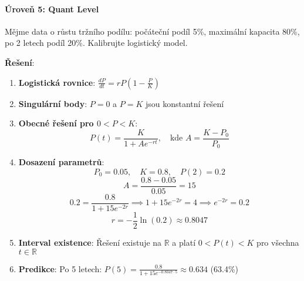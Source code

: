 \vspace{0.8\baselineskip}

\paragraph*{Úroveň 5: Quant Level}

\begin{example}
    Mějme data o růstu tržního podílu: počáteční podíl 5\%, maximální kapacita 80\%, po 2 letech podíl 20\%. Kalibrujte logistický model.
    
    \vspace{0.3\baselineskip}
    
    \textbf{Řešení}: 
    \begin{enumerate}
    \item \textbf{Logistická rovnice}: $\frac{dP}{dt} = rP(1 - \frac{P}{K})$
    
    \item \textbf{Singulární body}: $P = 0$ a $P = K$ jsou konstantní řešení
    
    \item \textbf{Obecné řešení pro $0 < P < K$}:
    \[
    P(t) = \frac{K}{1 + Ae^{-rt}}, \quad \text{kde } A = \frac{K - P_0}{P_0}
    \]
    
    \item \textbf{Dosazení parametrů}:
    \[
    P_0 = 0.05, \quad K = 0.8, \quad P(2) = 0.2
    \]
    \[
    A = \frac{0.8 - 0.05}{0.05} = 15
    \]
    \[
    0.2 = \frac{0.8}{1 + 15e^{-2r}} \implies 1 + 15e^{-2r} = 4 \implies e^{-2r} = 0.2
    \]
    \[
    r = -\frac{1}{2}\ln(0.2) \approx 0.8047
    \]
    
    \item \textbf{Interval existence}: Řešení existuje na $\mathbb{R}$ a platí $0 < P(t) < K$ pro všechna $t \in \mathbb{R}$
    
    \item \textbf{Predikce}: Po 5 letech: $P(5) = \frac{0.8}{1 + 15e^{-0.8047 \cdot 5}} \approx 0.634$ (63.4\%)
    \end{enumerate}
    \end{example}

\vspace{0.6\baselineskip}

